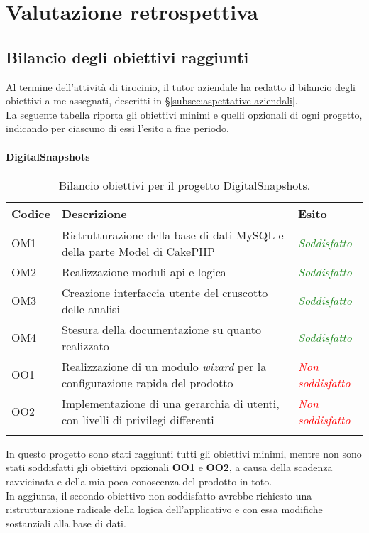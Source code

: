 \cleardoublepage
\chapter{Valutazione retrospettiva}
\label{cap:valutazione-retrospettiva}
\section{Bilancio degli obiettivi raggiunti}
\label{sec:bilancio-obiettivi}
Al termine dell'attività di tirocinio, il tutor aziendale ha redatto il bilancio degli obiettivi a me assegnati, descritti in §\ref{subsec:aspettative-aziendali}.\\
La seguente tabella riporta gli obiettivi minimi e quelli opzionali di ogni progetto, indicando per ciascuno di essi l'esito a fine periodo.
\subsubsection*{DigitalSnapshots}
\begin{center}
	\renewcommand{\arraystretch}{1.5}
	\begin{longtable}{ | p{0.1\linewidth} | p{0.7\linewidth} | p{0.2\linewidth}|}	 
		\hline
	    \rowcolor{header}\textbf{Codice}&\textbf{Descrizione} & \textbf{Esito}\\
		\hline    	
    	OM1 & Ristrutturazione della base di dati MySQL e della parte Model di CakePHP & \textcolor{ForestGreen}{\textit{Soddisfatto}} \\
    	OM2 & Realizzazione moduli \acrshort{api} e logica & \textcolor{ForestGreen}{\textit{Soddisfatto}} \\
    	OM3 & Creazione interfaccia utente del cruscotto delle analisi & \textcolor{ForestGreen}{\textit{Soddisfatto}} \\
    	OM4 & Stesura della documentazione su quanto realizzato & \textcolor{ForestGreen}{\textit{Soddisfatto}}\\
    	OO1 & Realizzazione di un modulo \textit{wizard} per la configurazione rapida del prodotto & \textcolor{red}{\textit{Non soddisfatto}} \\
    	OO2 & Implementazione di una gerarchia di utenti, con livelli di privilegi differenti & \textcolor{red}{\textit{Non soddisfatto}} \\
    	\hline
		\rowcolor{white}    	
    	\caption{Bilancio obiettivi per il progetto DigitalSnapshots.}
	\end{longtable}
	\label{tab:bilancio-obiettivi-digitalsnapshots}
\end{center}
In questo progetto sono stati raggiunti tutti gli obiettivi minimi, mentre non sono stati soddisfatti gli obiettivi opzionali \textbf{OO1} e \textbf{OO2}, a causa della scadenza ravvicinata e della mia poca conoscenza del prodotto in toto.\\
In aggiunta, il secondo obiettivo non soddisfatto avrebbe richiesto una ristrutturazione radicale della logica dell'applicativo e con essa modifiche sostanziali alla base di dati.

